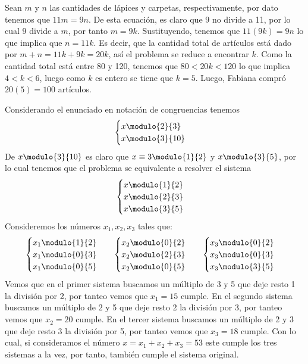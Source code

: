 \begin{solution}[(Problema 6)]
    Sean $m$ y $n$ las cantidades de lápices y carpetas, respectivamente, por dato tenemos que $11m = 9n$.
    De esta ecuación, es claro que 9 no divide a 11, por lo cual 9 divide a $m$, por tanto $m = 9k$.
    Sustituyendo, tenemos que $11 (9k) = 9n$ lo que implica que $n = 11k$.
    Es decir, que la cantidad total de artículos está dado por $m + n = 11k + 9k = 20k$, así el problema se reduce a encontrar $k$.
    Como la cantidad total está entre 80 y 120, tenemos que $80 < 20k < 120$ lo que implica $4 < k < 6$, luego como $k$ es entero se tiene que $k = 5$.
    Luego, Fabiana compró $20(5) = 100$ artículos.
\end{solution}

\begin{solution}[(Problema 7)]
    Considerando el enunciado en notación de congruencias tenemos
    \[
        \begin{cases}
            x \modulo{2}{3}\\
            x \modulo{3}{10}
        \end{cases}
    \]
    De $x \modulo{3}{10}$ es claro que $x \equiv 3 \modulo{1}{2}$ y $x \modulo{3}{5}$, por lo cual tenemos que el
    problema se equivalente a resolver el sistema
    \[
        \begin{cases}
            x \modulo{1}{2}\\
            x \modulo{2}{3}\\
            x \modulo{3}{5}
        \end{cases}
    \]
    Consideremos los números $x_1, x_2, x_3$ tales que:
    \begin{align*}
        \begin{cases}
            x_1 \modulo{1}{2}\\
            x_1 \modulo{0}{3}\\
            x_1 \modulo{0}{5}
        \end{cases} &&
        \begin{cases}
            x_2 \modulo{0}{2}\\
            x_2 \modulo{2}{3}\\
            x_2 \modulo{0}{5}
        \end{cases} &&
        \begin{cases}
            x_3 \modulo{0}{2}\\
            x_3 \modulo{0}{3}\\
            x_3 \modulo{3}{5}
        \end{cases}
    \end{align*}
    Vemos que en el primer sistema buscamos un múltiplo de 3 y 5 que deje resto 1 la división por 2, por tanteo vemos que $x_1 = 15$ cumple.
    En el segundo sistema buscamos un múltiplo de 2 y 5 que deje resto 2 la división por 3, por tanteo vemos que $x_2 = 20$ cumple.
    En el tercer sistema buscamos un múltiplo de 2 y 3 que deje resto 3 la división por 5, por tanteo vemos que $x_3 = 18$ cumple.
    Con lo cual, si consideramos el número $x = x_1 + x_2 + x_3 = 53$ este cumple los tres sistemas a la vez, por tanto, también cumple el sistema original.


\end{solution}
